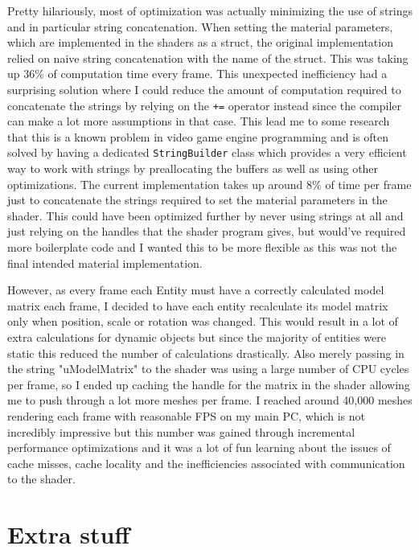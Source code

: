 \documentclass[11pt]{article}
\begin{document}
Pretty hilariously, most of optimization was actually minimizing the use of strings and in particular string concatenation. When setting the material parameters, which are implemented in the shaders as a struct, the original implementation relied on naive string concatenation with the name of the struct. This was taking up 36\% of computation time every frame. This unexpected inefficiency had a surprising solution where I could reduce the amount of computation required to concatenate the strings by relying on the \texttt{+=} operator instead since the compiler can make a lot more assumptions in that case. This lead me to some research that this is a known problem in video game engine programming and is often solved by having a dedicated \texttt{StringBuilder} class which provides a very efficient way to work with strings by preallocating the buffers as well as using other optimizations. The current implementation takes up around 8\% of time per frame just to concatenate the strings required to set the material parameters in the shader. This could have been optimized further by never using strings at all and just relying on the handles that the shader program gives, but would've required more boilerplate code and I wanted this to be more flexible as this was not the final intended material implementation.

However, as every frame each Entity must have a correctly calculated model matrix each frame, I decided to have each entity recalculate its model matrix only when position, scale or rotation was changed. This would result in a lot of extra calculations for dynamic objects but since the majority of entities were static this reduced the number of calculations drastically. Also merely passing in the string "uModelMatrix" to the shader was using a large number of CPU cycles per frame, so I ended up caching the handle for the matrix in the shader allowing me to push through a lot more meshes per frame. I reached around 40,000 meshes rendering each frame with reasonable FPS on my main PC, which is not incredibly impressive but this number was gained through incremental performance optimizations and it was a lot of fun learning about the issues of cache misses, cache locality and the inefficiencies associated with communication to the shader.

\section{Extra stuff}
\label{sec:org48844d7}
\end{document}
